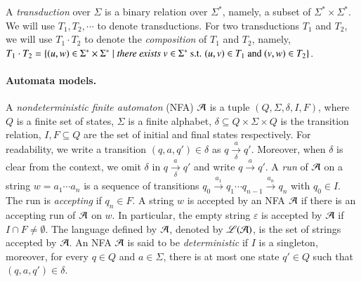 A \emph{transduction} over $\Sigma$ is a binary relation over $\Sigma^*$, namely, a subset of $\Sigma^* \times \Sigma^*$. We will use $T_1, T_2,\cdots$ to denote transductions. For two transductions $T_1$ and $T_2$, we will use $T_1 \cdot T_2$ to denote the \emph{composition} of $T_1$ and $T_2$, namely, $T_1 \cdot T_2 = \{(u, w) \in \Sigma^* \times \Sigma^* \mid \emph{there exists } v \in \Sigma^* \mbox{ s.t. } (u,v) \in T_1 \mbox{ and } (v,w) \in T_2\}$.

\paragraph*{Automata models.} A \emph{nondeterministic finite automaton} (NFA) $\mathcal{A}$ is a tuple $(Q, \Sigma, \delta, I, F)$, where $Q$ is a finite set of states, $\Sigma$ is a finite alphabet, $\delta \subseteq Q \times \Sigma \times Q$ is the transition relation, $I,F \subseteq Q$ are the set of initial and final states respectively. For readability, we write a transition $(q, a, q') \in \delta$ as $q \xrightarrow[\delta]{a} q'$. Moreover, when $\delta$ is clear from the context, we omit $\delta$ in $q \xrightarrow[\delta]{a} q'$ and write $q \xrightarrow{a} q'$.
%
A \emph{run} of $\mathcal{A}$ on a string $w = a_1 \cdots a_n$ is a sequence of transitions $q_0 \xrightarrow{a_1} q_1 \cdots q_{n-1} \xrightarrow{a_n} q_n$ with $q_0 \in I$. The run is \emph{accepting} if $q_n \in F$.
A string $w$ is accepted by an NFA $\mathcal{A}$ if there is an accepting run of $\mathcal{A}$ on $w$. In particular, the empty string $\varepsilon$ is accepted by $\mathcal{A}$ if $I \cap F \neq \emptyset$. The language defined by $\mathcal{A}$, denoted by $\mathscr{L}(\mathcal{A})$, is the set of strings accepted by $\mathcal{A}$. An NFA $\mathcal{A}$ is said to be \emph{deterministic} if $I$ is a singleton, moreover, for every $q \in Q$ and $a \in \Sigma$, there is at most one state $q' \in Q$ such that $(q, a, q') \in \delta$.

 




